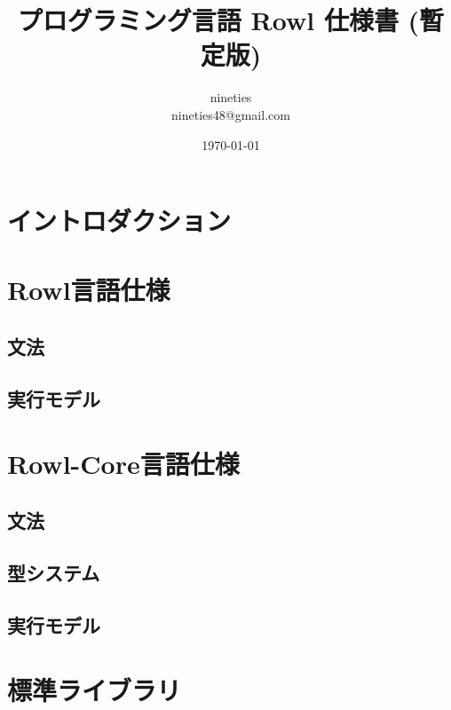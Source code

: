 \documentclass[a4paper,10pt]{jbook}
\title{プログラミング言語 Rowl 仕様書 (暫定版)}
\date{\today}
\author{nineties\\nineties48@gmail.com\\}
\begin{document}
\maketitle
\chapter{イントロダクション}
\chapter{Rowl言語仕様}
\section{文法}
\section{実行モデル}
\chapter{Rowl-Core言語仕様}
\section{文法}
\section{型システム}
\section{実行モデル}
\chapter{標準ライブラリ}
\end{document}
